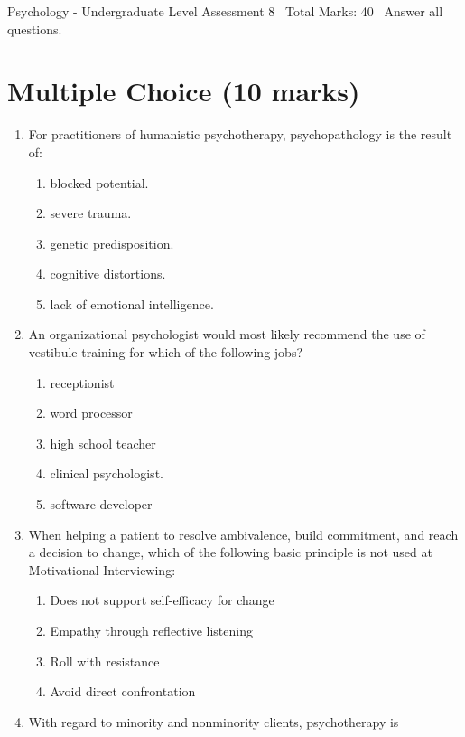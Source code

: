 \documentclass[12pt]{article}
\begin{document}
\begin{center}
Psychology - Undergraduate Level Assessment 8 \
Total Marks: 40 \
Answer all questions.
\end{center}

\section*{Multiple Choice (10 marks)}
\begin{enumerate}[label=\arabic*.]
\item For practitioners of humanistic psychotherapy, psychopathology is the result of:
\begin{enumerate}[label=(\alph*)]
    \item blocked potential.
    \item severe trauma.
    \item genetic predisposition.
    \item cognitive distortions.
    \item lack of emotional intelligence.
\end{enumerate}
\item An organizational psychologist would most likely recommend the use of vestibule training for which of the following jobs?
\begin{enumerate}[label=(\alph*)]
    \item receptionist
    \item word processor
    \item high school teacher
    \item clinical psychologist.
    \item software developer
\end{enumerate}
\item When helping a patient to resolve ambivalence, build commitment, and reach a decision to change, which of the following basic principle is not used at Motivational Interviewing:
\begin{enumerate}[label=(\alph*)]
    \item Does not support self-efficacy for change
    \item Empathy through reflective listening
    \item Roll with resistance
    \item Avoid direct confrontation
\end{enumerate}
\item With regard to minority and nonminority clients, psychotherapy is
\begin{enumerate}[label=(\alph*)]

\end{enumerate}
\end{enumerate}
\end{document}
